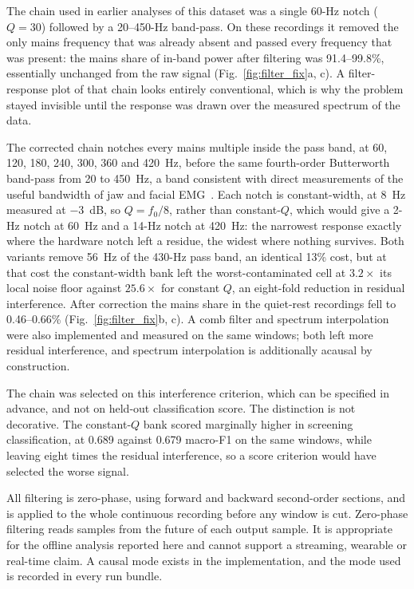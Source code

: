 \documentclass[pdflatex,sn-nature,iicol]{sn-jnl}
\begin{document}
The chain used in earlier analyses of this dataset was a single 60-Hz notch ($Q=30$) followed by a 20--450-Hz band-pass. On these recordings it removed the only mains frequency that was already absent and passed every frequency that was present: the mains share of in-band power after filtering was 91.4--99.8\%, essentially unchanged from the raw signal (Fig.~\ref{fig:filter_fix}a, c). A filter-response plot of that chain looks entirely conventional, which is why the problem stayed invisible until the response was drawn over the measured spectrum of the data.

The corrected chain notches every mains multiple inside the pass band, at 60, 120, 180, 240, 300, 360 and 420~Hz, before the same fourth-order Butterworth band-pass from 20 to 450~Hz, a band consistent with direct measurements of the useful bandwidth of jaw and facial EMG~\cite{vanboxtel2001optimal,deluca2010filtering}. Each notch is constant-width, at 8~Hz measured at $-3$~dB, so $Q = f_0/8$, rather than constant-$Q$, which would give a 2-Hz notch at 60~Hz and a 14-Hz notch at 420~Hz: the narrowest response exactly where the hardware notch left a residue, the widest where nothing survives. Both variants remove 56~Hz of the 430-Hz pass band, an identical 13\% cost, but at that cost the constant-width bank left the worst-contaminated cell at $3.2\times$ its local noise floor against $25.6\times$ for constant $Q$, an eight-fold reduction in residual interference. After correction the mains share in the quiet-rest recordings fell to 0.46--0.66\% (Fig.~\ref{fig:filter_fix}b, c). A comb filter and spectrum interpolation~\cite{mewett2004reducing} were also implemented and measured on the same windows; both left more residual interference, and spectrum interpolation is additionally acausal by construction.

The chain was selected on this interference criterion, which can be specified in advance, and not on held-out classification score. The distinction is not decorative. The constant-$Q$ bank scored marginally higher in screening classification, at 0.689 against 0.679 macro-F1 on the same windows, while leaving eight times the residual interference, so a score criterion would have selected the worse signal.

All filtering is zero-phase, using forward and backward second-order sections, and is applied to the whole continuous recording before any window is cut. Zero-phase filtering reads samples from the future of each output sample. It is appropriate for the offline analysis reported here and cannot support a streaming, wearable or real-time claim. A causal mode exists in the implementation, and the mode used is recorded in every run bundle.
\end{document}
